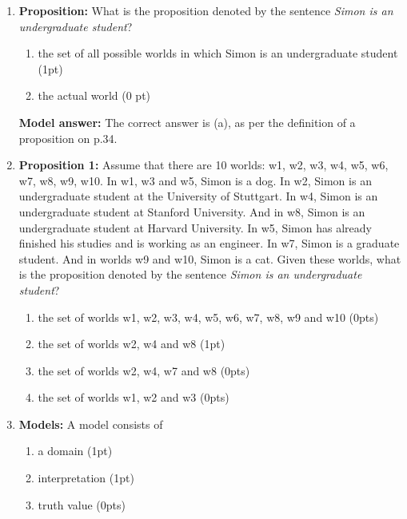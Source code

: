 \documentclass[a4,11pt]{article}
\begin{document}
\begin{enumerate}[leftmargin = 12pt]
     {\bf Model answer:} The correct answer is `the set of possible worlds in which a sentence is true ' as per the definition on p.34.

   \item {\bf Proposition:}   What is the proposition denoted by the sentence \textit{Simon is an undergraduate student}?
       \begin{enumerate}[noitemsep]
       \item the set of all possible worlds in which Simon is an undergraduate student (1pt)
        \item the actual world (0 pt)
    \end{enumerate}     
    
 {\bf Model answer:} The correct answer is (a), as per the definition of a proposition on p.34.
    
      \item {\bf Proposition 1:}  Assume that there are 10 worlds: w1, w2, w3, w4, w5, w6, w7, w8, w9, w10. In w1, w3 and w5, Simon is a dog. In w2, Simon is an undergraduate student at the University of Stuttgart. In w4, Simon is an undergraduate student at Stanford University. And in w8, Simon is an undergraduate student at Harvard University. In w5, Simon has already finished his studies and is working as an engineer. In w7, Simon is a graduate student. And in worlds w9 and w10, Simon is a cat.     
      Given these worlds, what is the proposition denoted by the sentence \textit{Simon is an undergraduate student}?
      
       \begin{enumerate}[noitemsep]
       \item the set of worlds w1, w2, w3, w4, w5, w6, w7, w8, w9 and w10 (0pts)
       \item the set of worlds w2, w4 and w8 (1pt)
       \item the set of worlds w2, w4, w7 and w8 (0pts)
       \item the set of worlds w1, w2 and w3 (0pts)       
    \end{enumerate}     


          \item {\bf Models:}   A model consists of
       \begin{enumerate}[noitemsep]
       \item a domain (1pt)
        \item interpretation (1pt)
        \item truth value (0pts)
         \end{enumerate}
            

\end{enumerate}
\end{document}
